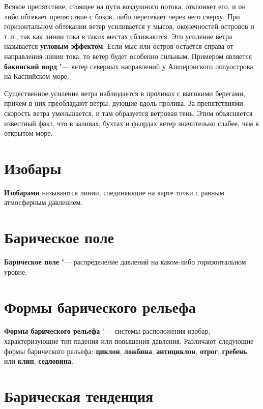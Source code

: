 \documentclass[a4paper, 12pt, twoside, final, book, russian, fittopage, cyremdash, openright]{ncc}
\begin{document}
Всякое препятствие, стоящее на пути воздушного потока, отклоняет его,
и он либо обтекает препятствие с боков, либо перетекает через него
сверху. При горизонтальном обтекании ветер усиливается у мысов,
оконечностей островов и т.\,п., так как линии тока в таких местах
сближаются. Это усиление ветра называется \textbf{угловым
  эффектом}. Если мыс или остров остаётся справа
от направления линии тока, то ветер будет особенно сильным. Примером
является \textbf{бакинский норд} "--- ветер
северных направлений у Апшеронского полуострова на Каспийском море.

Существенное усиление ветра наблюдается в проливах с высокими
берегами, причём в них преобладают ветры, дующие вдоль пролива.  За
препятствиями скорость ветра уменьшается, и там образуется ветровая
тень. Этим объясняется известный факт, что в заливах, бухтах и фьордах
ветер значительно слабее, чем в открытом море.

\section{Изобары}
\label{sec:isobars}

\textbf{Изобарами} называются линии, соединяющие на карте точки с равным атмосферным давлением.

\section{Барическое поле}
\label{sec:baric_field}

\textbf{Барическое поле} "--- распределение давлений на каком-либо горизонтальном уровне.

\section{Формы барического рельефа}
\label{sec:baric_relief}

\textbf{Формы барического рельефа}
"--- системы расположения изобар, характеризующие тип падения или
повышения давления. Различают следующие формы барического рельефа:
\textbf{циклон}, \textbf{ложбина}, \textbf{антициклон},
\textbf{отрог}, \textbf{гребень} или \textbf{клин},
\textbf{седловина}.

\section{Барическая тенденция}
\label{sec:baric_tendency}
\end{document}
